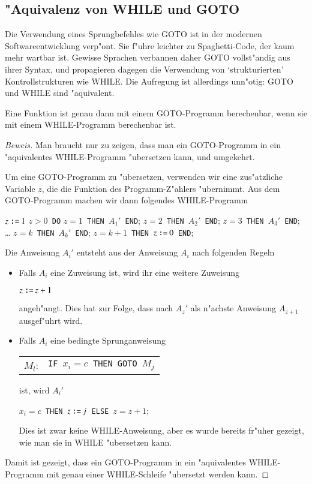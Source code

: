\subsection{"Aquivalenz von WHILE und GOTO}
Die Verwendung eines Sprungbefehles wie GOTO ist in der modernen
Softwareentwicklung verp"ont. Sie f"uhre leichter zu Spaghetti-Code,
der kaum mehr wartbar ist. Gewisse Sprachen verbannen daher
GOTO vollst"andig aus ihrer Syntax, und propagieren dagegen
die Verwendung von `strukturierten' Kontrollstrukturen wie
WHILE. Die Aufregung ist allerdings unn"otig: GOTO und WHILE sind "aquivalent.


\begin{satz}
Eine Funktion ist genau dann mit einem GOTO-Programm berechenbar,
wenn sie mit einem WHILE-Programm berechenbar ist.
\end{satz}
\begin{proof}[Beweis]
Man braucht nur zu zeigen, dass man ein GOTO-Programm in ein "aquivalentes
WHILE-Programm "ubersetzen kann, und umgekehrt.

Um eine GOTO-Programm zu "ubersetzen, verwenden wir eine zus"atzliche Variable
$z$, die die Funktion des Programm-Z"ahlers "ubernimmt.
Aus dem GOTO-Programm machen wir dann folgendes WHILE-Programm
\begin{algorithmic}
\STATE $z \mathbin{\texttt{:=}} 1$
$z>0${\tt\ DO}
$z=1${\tt\ THEN\ }$A_1'${\tt\ END};
$z=2${\tt\ THEN\ }$A_2'${\tt\ END};
$z=3${\tt\ THEN\ }$A_3'${\tt\ END};
\STATE\dots
{}$z=k${\tt\ THEN\ }$A_k'${\tt\ END};
$z=k+1${\tt\ THEN\ }$z \mathbin{\texttt{:=}} 0${\tt\ END};
\end{algorithmic}
Die Anweisung $A_i'$ entsteht aus der Anweisung $A_i$ nach folgenden
Regeln
\begin{itemize}
\item Falls $A_i$ eine Zuweisung ist, wird ihr eine weitere Zuweisung
\begin{algorithmic}
\STATE $z \mathbin{\texttt{:=}} z+1$
\end{algorithmic}
angeh"angt.
Dies hat zur Folge, dass nach $A_z'$ als n"achste Anweisung
$A_{z+1}$ ausgef"uhrt wird.
\item
Falls $A_i$ eine bedingte Sprunganweisung
\begin{center}
\begin{tabular}{rl}
$M_l$:&{\tt IF\ }$x_i=c${\tt\ THEN GOTO\ }$M_j$
\end{tabular}
\end{center}
ist, wird $A_i'$
\begin{algorithmic}
$x_i=c${\tt\ THEN\ }$z \mathbin{\texttt{:=}} j${\tt\ ELSE }$z=z+1$;
\end{algorithmic}
Dies ist zwar keine WHILE-Anweisung, aber es wurde bereits
fr"uher gezeigt, wie man sie in WHILE "ubersetzen kann.
\end{itemize}
Damit ist gezeigt, dass ein GOTO-Programm in ein "aquivalentes WHILE-Programm
mit genau einer WHILE-Schleife "ubersetzt werden kann.


\end{proof}
